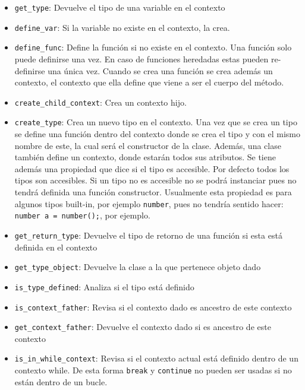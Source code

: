 \begin{itemize}
\begin{itemize}
	\item \verb|get_type|: Devuelve el tipo de una variable en el contexto
	
	\item \verb|define_var|: Si la variable no existe en el contexto, la crea. 
	
	\item \verb|define_func|: Define la funci\'on si no existe en el contexto. Una función solo puede definirse una vez. En caso de funciones heredadas estas pueden re-definirse una única vez. Cuando se crea una función se crea además un contexto, el contexto que ella define que viene a ser el cuerpo del método.
	
	\item \verb|create_child_context|: Crea un contexto hijo.
	
	\item \verb|create_type|: Crea un nuevo tipo en el contexto. Una vez que se crea un tipo se define una función dentro del contexto donde se crea el tipo y con el mismo nombre de este, la cual será el constructor de la clase. Además, una clase también define un contexto, donde estarán todos sus atributos. Se tiene además una propiedad que dice si el tipo es accesible. Por defecto todos los tipos son accesibles. Si un tipo no es accesible no se podrá instanciar pues no tendrá definida una función constructor. Usualmente esta propiedad es para algunos tipos built-in, por ejemplo \verb|number|, pues no tendría sentido hacer: \verb|number a = number();|, por ejemplo.
	
	\item \verb|get_return_type|: Devuelve el tipo de retorno de una funci\'on si esta est\'a definida en el contexto
	
	\item \verb|get_type_object|: Devuelve la clase a la que pertenece objeto dado 
	
	\item \verb|is_type_defined|: Analiza si el tipo est\'a definido
	
	\item \verb|is_context_father|: Revisa si el contexto dado es ancestro de este contexto
	
	\item \verb|get_context_father|: Devuelve el contexto dado si es ancestro de este contexto
	
	\item \verb|is_in_while_context|: Revisa si el contexto actual está definido dentro de un contexto while. De esta forma \verb|break| y \verb|continue| no pueden ser usadas si no están dentro de un bucle.
	

\end{itemize}
\end{itemize}
